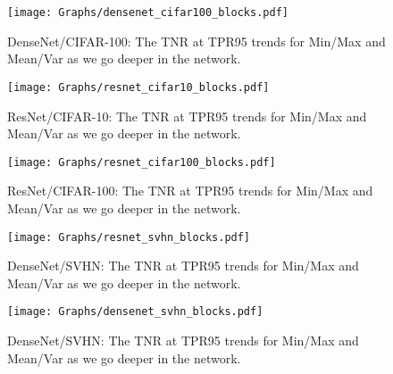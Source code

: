 \documentclass{article}
\begin{document}
\begin{figure}[H]
    \hspace{-1.5in}
    \texttt{[image: Graphs/densenet\_cifar100\_blocks.pdf]}
    \caption{DenseNet/CIFAR-100: The TNR at TPR95 trends for Min/Max and Mean/Var as we go deeper in the network.}
\end{figure}

\begin{figure}[H]
    \hspace{-1.5in}
    \texttt{[image: Graphs/resnet\_cifar10\_blocks.pdf]}
    \caption{ResNet/CIFAR-10: The TNR at TPR95 trends for Min/Max and Mean/Var as we go deeper in the network.}
\end{figure}

\begin{figure}[H]
    \hspace{-1.5in}
    \texttt{[image: Graphs/resnet\_cifar100\_blocks.pdf]}
    \caption{ResNet/CIFAR-100: The TNR at TPR95 trends for Min/Max and Mean/Var as we go deeper in the network.}
\end{figure}

\begin{figure}[H]
    \hspace{-1.5in}
    \texttt{[image: Graphs/resnet\_svhn\_blocks.pdf]}
    \caption{DenseNet/SVHN: The TNR at TPR95 trends for Min/Max and Mean/Var as we go deeper in the network.}
\end{figure}

\begin{figure}[H]
    \hspace{-1.5in}
    \texttt{[image: Graphs/densenet\_svhn\_blocks.pdf]}
    \caption{DenseNet/SVHN: The TNR at TPR95 trends for Min/Max and Mean/Var as we go deeper in the network.}
\end{figure}
\end{document}

